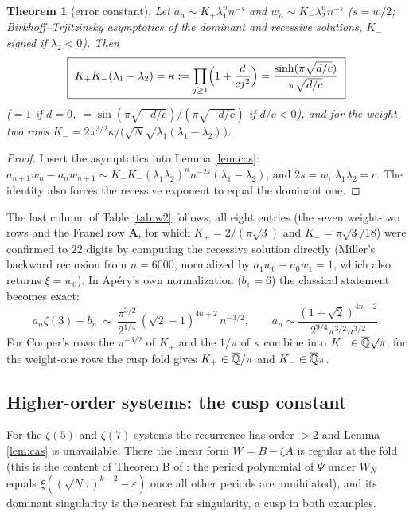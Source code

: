 \documentclass[11pt]{amsart}
\newtheorem{theorem}{Theorem}[section]
\theoremstyle{definition}
\theoremstyle{remark}
\begin{document}
\begin{theorem}[error constant]\label{thm:cas}
Let $a_n\sim K_+\lambda_1^nn^{-s}$ and $w_n\sim K_-\lambda_2^nn^{-s}$ ($s=w/2$; Birkhoff--Trjitzinsky asymptotics of the dominant and recessive solutions, $K_-$ signed if $\lambda_2<0$). Then
$$\boxed{\ K_+K_-(\lambda_1-\lambda_2)=\kappa:=\prod_{j\ge1}\Bigl(1+\frac d{cj^2}\Bigr)=\frac{\sinh(\pi\sqrt{d/c})}{\pi\sqrt{d/c}}\ }$$
($=1$ if $d=0$, $=\sin(\pi\sqrt{-d/c})/(\pi\sqrt{-d/c})$ if $d/c<0$), and for the weight-two rows $K_-=2\pi^{3/2}\kappa/\bigl(\sqrt N\sqrt{\lambda_1(\lambda_1-\lambda_2)}\bigr)$.
\end{theorem}
\begin{proof}
Insert the asymptotics into Lemma \ref{lem:cas}: $a_{n+1}w_n-a_nw_{n+1}\sim K_+K_-(\lambda_1\lambda_2)^nn^{-2s}(\lambda_1-\lambda_2)$, and $2s=w$, $\lambda_1\lambda_2=c$. The identity also forces the recessive exponent to equal the dominant one.
\end{proof}
The last column of Table \ref{tab:w2} follows; all eight entries (the seven weight-two rows and the Franel row $\mathbf A$, for which $K_+=2/(\pi\sqrt3)$ and $K_-=\pi\sqrt3/18$) were confirmed to $22$ digits by computing the recessive solution directly (Miller's backward recursion from $n=6000$, normalized by $a_1w_0-a_0w_1=1$, which also returns $\xi=w_0$). In Ap\'ery's own normalization ($b_1=6$) the classical statement becomes exact:
$$a_n\zeta(3)-b_n\ \sim\ \frac{\pi^{3/2}}{2^{1/4}}\,(\sqrt2-1)^{4n+2}\,n^{-3/2},\qquad a_n\sim\frac{(1+\sqrt2)^{4n+2}}{2^{9/4}\pi^{3/2}n^{3/2}} .$$
For Cooper's rows the $\pi^{-3/2}$ of $K_+$ and the $1/\pi$ of $\kappa$ combine into $K_-\in\overline{\mathbb Q}\sqrt\pi$; for the weight-one rows the cusp fold gives $K_+\in\overline{\mathbb Q}/\pi$ and $K_-\in\overline{\mathbb Q}\pi$.

\subsection{Higher-order systems: the cusp constant}
For the $\zeta(5)$ and $\zeta(7)$ systems the recurrence has order $>2$ and Lemma \ref{lem:cas} is unavailable. There the linear form $W=B-\xi A$ is regular at the fold (this is the content of Theorem B of \cite{ProjSources}: the period polynomial of $\Psi$ under $W_N$ equals $\xi((\sqrt N\tau)^{k-2}-\varepsilon)$ once all other periods are annihilated), and its dominant singularity is the nearest far singularity, a cusp in both examples.
\end{document}
